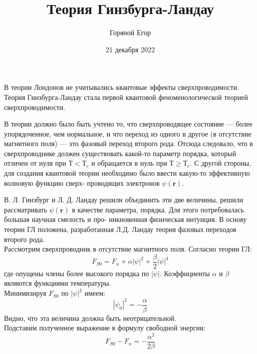 \documentclass[a4paper]{article}
\begin{document}
\author{Горяной Егор}
\date{21 декабря 2022}
\title{Теория Гинзбурга-Ландау}
\maketitle
В теории Лондонов не учитывались квантовые эффекты сверхпроводимости. Теория Гинзбурга-Ландау стала первой квантовой феноменологической теорией сверхпроводимости.

В теории должно было быть учтено то, что сверхпроводящее
состояние — более упорядоченное, чем нормальное, и что переход
из одного в другое (в отсутствие магнитного поля) — это фазовый переход второго рода. Отсюда следовало, что в сверхпроводнике должен существовать какой-то параметр порядка, который
отличен от нуля при $Т < Т_c$ и обращается в нуль при $Т \geq Т_c$.
С другой стороны, для создания квантовой теории необходимо
было ввести какую-то эффективную волновую функцию сверх-
проводящих электронов $\psi(\textbf{r})$.

В. Л. Гинзбург и Л. Д. Ландау решили объединить эти две величины, решили рассматривать $\psi(\textbf{r})$ в качестве параметра, порядка. Для этого потребовалась большая научная смелость и про-
никновенная физическая интуиция. В основу теории ГЛ положена,
разработанная Л.Д. Ландау теория фазовых переходов второго
рода.\\
Рассмотрим сверхпроводник в отсутствие магнитного поля. Согласно теории ГЛ:
\begin{equation} \label{eq:1}
F_{S0}=F_n+\alpha|\psi|^2+\frac{\beta}{2}|\psi|^4
\end{equation}
где опущены члены более высокого порядка по $|\psi|$. Коэффициенты $\alpha$ и $\beta$ являются функциями температуры.\\
Минимизируя $F_{S0}$ по $|\psi|^2$ имеем:
\begin{equation} \label{eq:2}
|\psi_0|^2=-\frac{\alpha}{\beta}
\end{equation}
Видно, что эта величина должна быть неотрицательной.\\
Подставим полученное выражение в формулу свободной энергии:
\begin{equation} \label{eq:3}
F_{S0}-F_n=-\frac{\alpha^2}{2\beta}
\end{equation}
\end{document}
